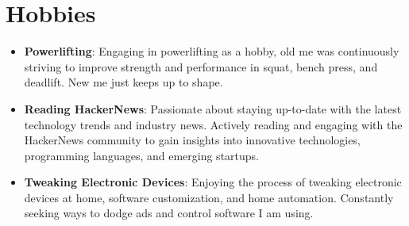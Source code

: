 \documentclass[letterpaper,11pt]{article}
\newcommand{\resumeItem}[2]{
  \item\small{
    \textbf{#1}{: #2 \vspace{-2pt}}
  }
}
\newcommand{\resumeSubItem}[2]{\resumeItem{#1}{#2}\vspace{-4pt}}
\newcommand{\resumeSubHeadingListStart}{\begin{itemize}[leftmargin=*]}
\newcommand{\resumeSubHeadingListEnd}{\end{itemize}}
\begin{document}
\section{Hobbies}
\resumeSubHeadingListStart
\resumeSubItem{Powerlifting}
{Engaging in powerlifting as a hobby, old me was continuously striving to improve strength and performance in squat, bench press, and deadlift. New me just keeps up to shape.}
\resumeSubItem{Reading HackerNews}
{Passionate about staying up-to-date with the latest technology trends and industry news. Actively reading and engaging with the HackerNews community to gain insights into innovative technologies, programming languages, and emerging startups.}
\resumeSubItem{Tweaking Electronic Devices}
{Enjoying the process of tweaking electronic devices at home, software customization, and home automation. Constantly seeking ways to dodge ads and control software I am using.}
\resumeSubHeadingListEnd
\end{document}
